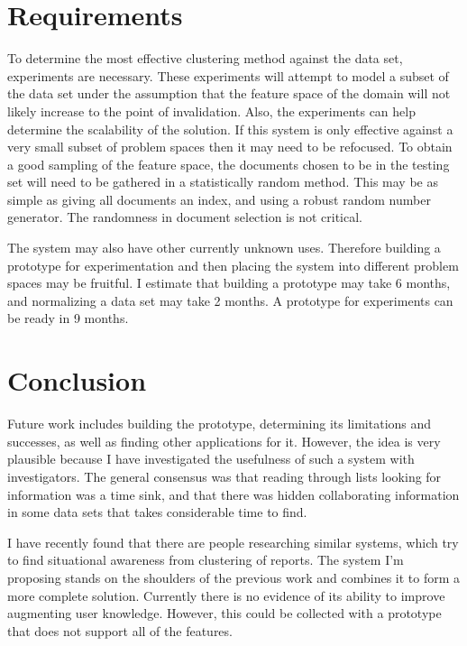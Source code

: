 \documentclass[11pt]{article}
\begin{document}
\section{Requirements}

To determine the most effective clustering method against the data set, experiments are necessary.
These experiments will attempt to model a subset of the data set under the assumption that the feature space of the domain will not likely increase to the point of invalidation.
Also, the experiments can help determine the scalability of the solution.
If this system is only effective against a very small subset of problem spaces then it may need to be refocused.
To obtain a good sampling of the feature space, the documents chosen to be in the testing set will need to be gathered in a statistically random method.
This may be as simple as giving all documents an index, and using a robust random number generator.
The randomness in document selection is not critical.

The system may also have other currently unknown uses.
Therefore building a prototype for experimentation and then placing the system into different problem spaces may be fruitful.
I estimate that building a prototype may take 6 months, and normalizing a data set may take 2 months.
A prototype for experiments can be ready in 9 months.

\section{Conclusion}

Future work includes building the prototype, determining its limitations and successes, as well as finding other applications for it.
However, the idea is very plausible because I have investigated the usefulness of such a system with investigators.
The general consensus was that reading through lists looking for information was a time sink, and that there was hidden collaborating information in some data sets that takes considerable time to find.

I have recently found that there are people researching similar systems, which try to find situational awareness from clustering of reports.
The system I'm proposing stands on the shoulders of the previous work and combines it to form a more complete solution.
Currently there is no evidence of its ability to improve augmenting user knowledge.  However, this could be collected with a prototype that does not support all of the features.



\end{document}
